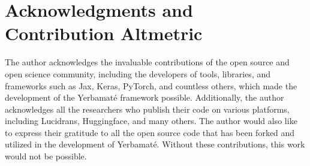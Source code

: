 

\section{Acknowledgments and Contribution Alt\-metric}

The author acknowledges the invaluable contributions of the open source and open science community, including the developers of tools, libraries, and frameworks such as Jax, Keras, PyTorch, and countless others, which made the development of the Yerbamaté framework possible. Additionally, the author acknowledges all the researchers who publish their code on various platforms, including Lucidrans, Huggingface, and many others. The author would also like to express their gratitude to all the open source code that has been forked and utilized in the development of Yerbamaté. Without these contributions, this work would not be possible.



